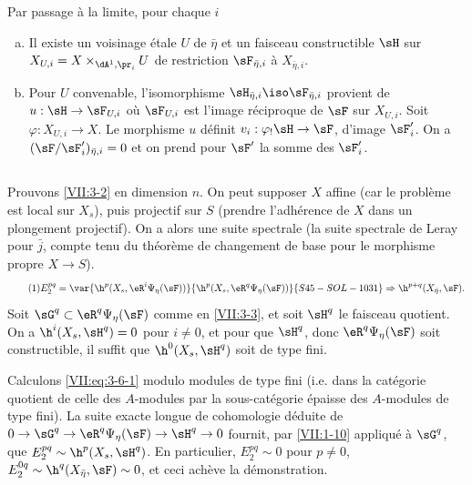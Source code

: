 Par passage à la limite, pour chaque $i$
\begin{enumerate}[a)]
  \item Il existe un voisinage étale $U$ de $\bar\eta$ et un faisceau 
    constructible $\sH$ sur $X_{U,i} = X\times_{\dA^1,\pr_i} U$ de restriction 
    $\sF_{\bar\eta,i}$ à $X_{\bar\eta,i}$. 
  \item Pour $U$ convenable, l'isomorphisme 
    $\sH_{\bar\eta,i} \iso \sF_{\bar\eta,i}$ provient de $u:\sH\to \sF_{U,i}$ 
    où $\sF_{U,i}$ est l'image réciproque de $\sF$ sur $X_{U,i}$. Soit 
    $\varphi:X_{U,i} \to X$. Le morphisme $u$ définit 
    $v_i:\varphi_! \sH \to \sF$, d'image $\sF_i'$. On a 
    $(\sF/\sF_i')_{\bar\eta,i} = 0$ et on prend pour $\sF'$ la somme des 
    $\sF_i'$. 
\end{enumerate}





\subsection{}\label{VII:3-6}

Prouvons \ref{VII:3-2} en dimension $n$. On peut supposer $X$ affine (car le 
problème est local sur $X_s$), puis projectif sur $S$ (prendre l'adhérence 
de $X$ dans un plongement projectif). On a alors une suite spectrale 
\cite[I 2.2.3]{sga7} (la suite spectrale de Leray pour $\bar j$, compte tenu du 
théorème de changement de base pour le morphisme propre $X\to S$). 
\begin{equation*}\tag{1}\label{VII:eq:3-6-1}
  E_2^{p q} = \var{\h^p(X_s,\eR^i\Psi_\eta(\sF))}{\h^p(X_s,\eR^q\Psi_\eta(\sF))}{S45-SOL-1031} \Rightarrow \h^{p+q}(X_{\bar\eta},\sF) \text{.} 
\end{equation*}
Soit $\sG^q\subset \eR^q \Psi_\eta(\sF)$ comme en \ref{VII:3-3}, et soit 
$\sH^q$ le faisceau quotient. On a $\h^i(X_s,\sH^q)=0$ pour $i\ne 0$, et pour 
que $\sH^q$, donc $\eR^q\Psi_\eta(\sF)$ soit constructible, il suffit que 
$\h^0(X_s,\sH^q)$ soit de type fini. 

Calculons \eqref{VII:eq:3-6-1} modulo modules de type fini (i.e. dans la 
catégorie quotient de celle des $A$-modules par la sous-catégorie épaisse 
des $A$-modules de type fini). La suite exacte longue de cohomologie déduite 
de $0 \to \sG^q \to \eR^q\Psi_\eta(\sF) \to \sH^q \to 0$ fournit, par 
\ref{VII:1-10} appliqué à $\sG^q$, que $E_2^{p q} \sim \h^p(X_s,\sH^q)$. 
En particulier, $E_2^{p q}\sim 0$ pour $p\ne 0$, 
$E_2^{0 q}\sim \h^q(X_{\bar\eta},\sF) \sim 0$, et ceci achève la 
démonstration. 

